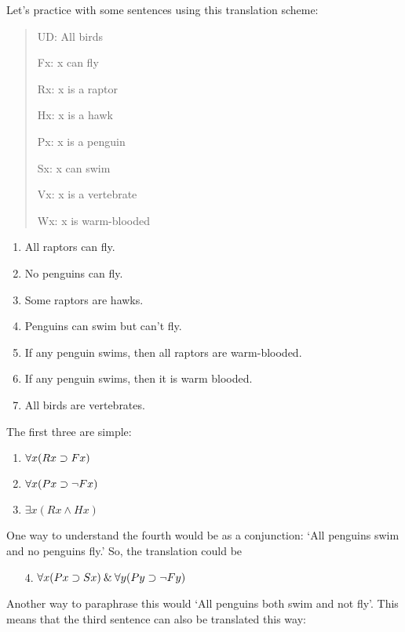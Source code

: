 \documentclass[../logic-text.tex]{subfiles}
\begin{document}


Let's practice with some sentences using this translation scheme:

\begin{quote}
  UD: All birds

  Fx: x can fly

  Rx: x is a raptor

  Hx: x is a hawk

  Px: x is a penguin

  Sx: x can swim

  Vx: x is a vertebrate

  Wx: x is warm-blooded
\end{quote}



\begin{enumerate}
  \item All raptors can fly.
  \item No penguins can fly.
  \item Some raptors are hawks.
  \item Penguins can swim but can't fly.
  \item If any penguin swims, then all raptors are warm-blooded.
  \item If any penguin swims, then it is warm blooded.
  \item All birds are vertebrates.
\end{enumerate}

The first three are simple:


\begin{enumerate}
  \item \(\forall x (Rx \supset Fx)\)
  \item \(\forall x(Px \supset \neg Fx)\)
  \item \(\exists x(Rx \land Hx)\)
\end{enumerate}

One way to understand the fourth would be as a conjunction: \enquote*{All penguins swim and no penguins fly.}
So, the translation could be

\begin{enumerate}
  \item[4.] \(\forall x (Px \supset Sx) \mathbin{\&} \forall y(Py \supset \neg Fy)\)
\end{enumerate}

Another way to paraphrase this would \enquote*{All penguins both swim and not fly}.  This means that the third sentence can also be translated this way:
\end{document}
